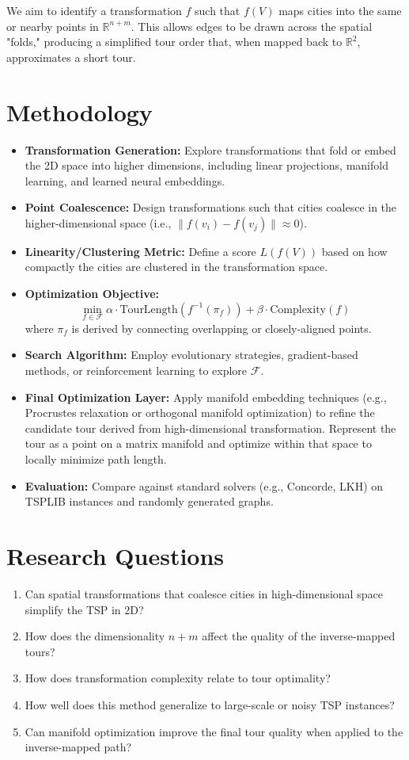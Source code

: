 \documentclass{article}
\begin{document}
We aim to identify a transformation $f$ such that $f(V)$ maps cities into the same or nearby points in $\mathbb{R}^{n+m}$. This allows edges to be drawn across the spatial "folds," producing a simplified tour order that, when mapped back to $\mathbb{R}^2$, approximates a short tour.

\section{Methodology}
\begin{itemize}
  \item \textbf{Transformation Generation:} Explore transformations that fold or embed the 2D space into higher dimensions, including linear projections, manifold learning, and learned neural embeddings.
  \item \textbf{Point Coalescence:} Design transformations such that cities coalesce in the higher-dimensional space (i.e., $\|f(v_i) - f(v_j)\| \approx 0$).
  \item \textbf{Linearity/Clustering Metric:} Define a score $L(f(V))$ based on how compactly the cities are clustered in the transformation space.
  \item \textbf{Optimization Objective:}
  \[
  \min_{f \in \mathcal{F}} \alpha \cdot \text{TourLength}(f^{-1}(\pi_f)) + \beta \cdot \text{Complexity}(f)
  \]
  where $\pi_f$ is derived by connecting overlapping or closely-aligned points.
  \item \textbf{Search Algorithm:} Employ evolutionary strategies, gradient-based methods, or reinforcement learning to explore $\mathcal{F}$.
  \item \textbf{Final Optimization Layer:} Apply manifold embedding techniques (e.g., Procrustes relaxation or orthogonal manifold optimization) to refine the candidate tour derived from high-dimensional transformation. Represent the tour as a point on a matrix manifold and optimize within that space to locally minimize path length.
  \item \textbf{Evaluation:} Compare against standard solvers (e.g., Concorde, LKH) on TSPLIB instances and randomly generated graphs.
\end{itemize}

\section{Research Questions}
\begin{enumerate}
  \item Can spatial transformations that coalesce cities in high-dimensional space simplify the TSP in 2D?
  \item How does the dimensionality $n+m$ affect the quality of the inverse-mapped tours?
  \item How does transformation complexity relate to tour optimality?
  \item How well does this method generalize to large-scale or noisy TSP instances?
  \item Can manifold optimization improve the final tour quality when applied to the inverse-mapped path?
\end{enumerate}
\end{document}
